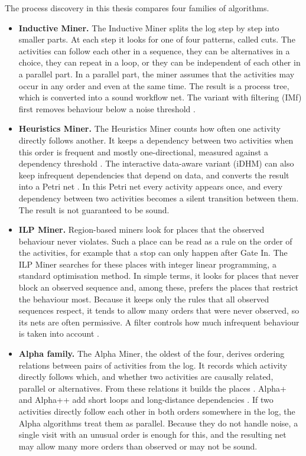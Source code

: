 The process discovery in this thesis compares four families of algorithms.
\begin{itemize}[itemsep=3pt,topsep=4pt]
\item \textbf{Inductive Miner.} The Inductive Miner splits the log step by step
into smaller parts. At each step it looks for one of four patterns, called
cuts. The activities can follow each other in a sequence, they can be
alternatives in a choice, they can repeat in a loop, or they can be independent
of each other in a parallel part. In a parallel part, the miner assumes that
the activities may occur in any order and even at the same time. The result is
a process tree, which is converted into a sound workflow net. The variant with
filtering (IMf) first removes behaviour below a noise threshold
\cite{Leemans2014InductiveMiner}.
\item \textbf{Heuristics Miner.} The Heuristics Miner counts how often one
activity directly follows another. It keeps a dependency between two activities
when this order is frequent and mostly one-directional, measured against a
dependency threshold \cite{heuristicsMiner2006,Weijters2011FHM}. The interactive
data-aware variant (iDHM) can also keep infrequent dependencies that depend on
data, and converts the result into a Petri net
\cite{Mannhardt2017iDHM}. In this Petri net every activity
appears once, and every dependency between two activities becomes a silent
transition between them. The result is not guaranteed to be sound.
\item \textbf{ILP Miner.} Region-based miners look for places that the observed
behaviour never violates. Such a place can be read as a rule on the order of
the activities, for example that a stop can only happen after Gate In. The ILP
Miner searches for these places with integer linear programming, a standard
optimisation method. In simple terms, it looks for places that never block an
observed sequence and, among these, prefers the places that restrict the behaviour
most. Because it keeps only the rules that all observed sequences respect, it tends
to allow many orders that were never observed, so its nets are often permissive. A filter controls how much infrequent behaviour
is taken into account \cite{RWVanZelst2018ILP}.
\item \textbf{Alpha family.} The Alpha Miner, the oldest of the four, derives
ordering relations between pairs of activities from the log. It records which
activity directly follows which, and whether two activities are causally
related, parallel or alternatives. From these relations it builds the places
\cite{vanderAalst2004AlphaMiner}. Alpha+ and Alpha++ add short loops and
long-distance dependencies \cite{deMedeiros2004AlphaPlus,Wen2007AlphaPlusPlus}.
If two activities directly follow each other in both orders somewhere in the log,
the Alpha algorithms treat them as parallel. Because they do not handle noise, a
single visit with an unusual order is enough for this, and the resulting net may
allow many more orders than observed or may not be sound.
\end{itemize}

